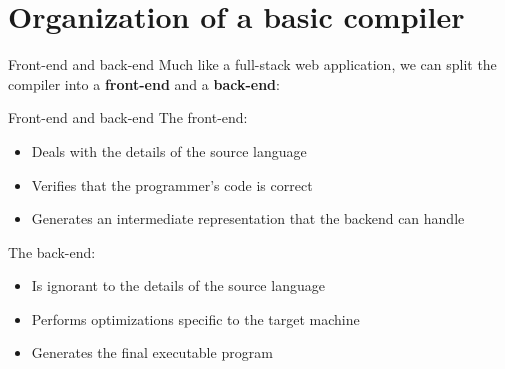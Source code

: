 \documentclass[../index.tex]{subfiles}
\begin{document}

\renewcommand{\sectiontitle}{Organization of a basic compiler}
\section{\sectiontitle}

\renewcommand{\currenttitle}{Front-end and back-end}
\begin{frame}{\currenttitle}
  Much like a full-stack web application, we can split the compiler into a
  \textbf{front-end} and a \textbf{back-end}: \\[2em]

\end{frame}

\begin{frame}{\currenttitle}
  The front-end:
  \begin{itemize}
    \item Deals with the details of the source language
    \item Verifies that the programmer's code is correct
    \item Generates an intermediate representation that the backend can handle
  \end{itemize}

  The back-end:
  \begin{itemize}
    \item Is ignorant to the details of the source language
    \item Performs optimizations specific to the target machine
    \item Generates the final executable program
  \end{itemize}
\end{frame}
\end{document}
